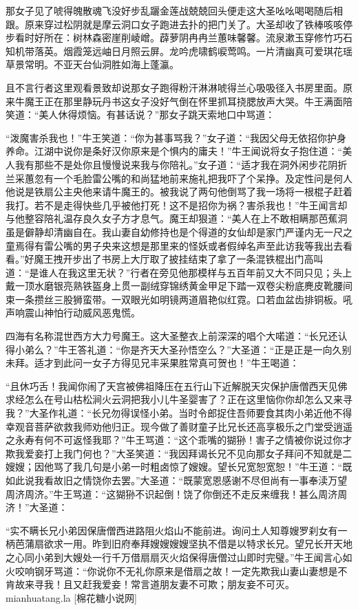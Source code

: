 \documentclass[12pt,UTF8]{ctexbook}
\begin{document}
那女子见了唬得魄散魂飞没好步乱躧金莲战兢兢回头便走这大圣吆吆喝喝随后相跟。原来穿过松阴就是摩云洞口女子跑进去扑的把门关了。大圣却收了铁棒咳咳停步看时好所在：树林森密崖削崚嶒。薜萝阴冉冉兰蕙味馨馨。流泉漱玉穿修竹巧石知机带落英。烟霞笼远岫日月照云屏。龙吟虎啸鹤唳莺鸣。一片清幽真可爱琪花瑶草景常明。不亚天台仙洞胜如海上蓬瀛。

且不言行者这里观看景致却说那女子跑得粉汗淋淋唬得兰心吸吸径入书房里面。原来牛魔王正在那里静玩丹书这女子没好气倒在怀里抓耳挠腮放声大哭。牛王满面陪笑道：“美人休得烦恼。有甚话说？”那女子跳天索地口中骂道：

“泼魔害杀我也！”牛王笑道：“你为甚事骂我？”女子道：“我因父母无依招你护身养命。江湖中说你是条好汉你原来是个惧内的庸夫！”牛王闻说将女子抱住道：“美人我有那些不是处你且慢慢说来我与你陪礼。”女子道：“适才我在洞外闲步花阴折兰采蕙忽有一个毛脸雷公嘴的和尚猛地前来施礼把我吓了个呆挣。及定性问是何人他说是铁扇公主央他来请牛魔王的。被我说了两句他倒骂了我一场将一根棍子赶着我打。若不是走得快些几乎被他打死！这不是招你为祸？害杀我也！”牛王闻言却与他整容陪礼温存良久女子方才息气。魔王却狠道：“美人在上不敢相瞒那芭蕉洞虽是僻静却清幽自在。我山妻自幼修持也是个得道的女仙却是家门严谨内无一尺之童焉得有雷公嘴的男子央来这想是那里来的怪妖或者假绰名声至此访我等我出去看看。”好魔王拽开步出了书房上大厅取了披挂结束了拿了一条混铁棍出门高叫道：“是谁人在我这里无状？”行者在旁见他那模样与五百年前又大不同只见；头上戴一顶水磨银亮熟铁盔身上贯一副绒穿锦绣黄金甲足下踏一双卷尖粉底麂皮靴腰间束一条攒丝三股狮蛮带。一双眼光如明镜两道眉艳似红霓。口若血盆齿排铜板。吼声响震山神怕行动威风恶鬼慌。

四海有名称混世西方大力号魔王。这大圣整衣上前深深的唱个大喏道：“长兄还认得小弟么？”牛王答礼道：“你是齐天大圣孙悟空么？”大圣道：“正是正是一向久别未拜。适才到此问一女子方得见兄丰采果胜常真可贺也！”牛王喝道：

“且休巧舌！我闻你闹了天宫被佛祖降压在五行山下近解脱天灾保护唐僧西天见佛求经怎么在号山枯松涧火云洞把我小儿牛圣婴害了？正在这里恼你你却怎么又来寻我？”大圣作礼道：“长兄勿得误怪小弟。当时令郎捉住吾师要食其肉小弟近他不得幸观音菩萨欲救我师劝他归正。现今做了善财童子比兄长还高享极乐之门堂受逍遥之永寿有何不可返怪我耶？”牛王骂道：“这个乖嘴的猢狲！害子之情被你说过你才欺我爱妾打上我门何也？”大圣笑道：“我因拜谒长兄不见向那女子拜问不知就是二嫂嫂；因他骂了我几句是小弟一时粗卤惊了嫂嫂。望长兄宽恕宽恕！”牛王道：“既如此说我看故旧之情饶你去罢。”大圣道：“既蒙宽恩感谢不尽但尚有一事奉渎万望周济周济。”牛王骂道：“这猢狲不识起倒！饶了你倒还不走反来缠我！甚么周济周济！”大圣道：

“实不瞒长兄小弟因保唐僧西进路阻火焰山不能前进。询问土人知尊嫂罗刹女有一柄芭蒲扇欲求一用。昨到旧府奉拜嫂嫂嫂嫂坚执不借是以特求长兄。望兄长开天地之心同小弟到大嫂处一行千万借扇扇灭火焰保得唐僧过山即时完璧。”牛王闻言心如火咬响钢牙骂道：“你说你不无礼你原来是借扇之故！一定先欺我山妻山妻想是不肯故来寻我！且又赶我爱妾！常言道朋友妻不可欺；朋友妾不可灭。mianhuatang.la [棉花糖小说网]
\end{document}
